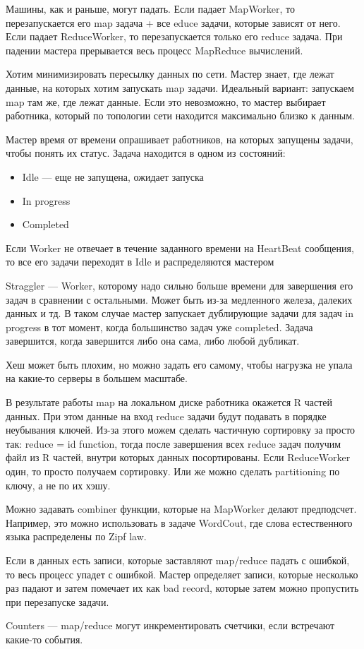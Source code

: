 \documentclass[12pt]{article}
\begin{document}
    \quad Машины, как и раньше, могут падать. Если падает MapWorker, то перезапускается его map задача + все educe задачи, которые зависят от него. Если падает ReduceWorker, то перезапускается только его reduce задача. При падении мастера прерывается весь процесс MapReduce вычислений.
    
    \quad Хотим минимизировать пересылку данных по сети. Мастер знает, где лежат данные, на которых хотим запускать map задачи. Идеальный вариант: запускаем map там же, где лежат данные. Если это невозможно, то мастер выбирает работника, который по топологии сети находится максимально близко к данным.
    
    \quad Мастер время от времени опрашивает работников, на которых запущены задачи, чтобы понять их статус. Задача находится в одном из состояний:
    \begin{itemize}
        \item Idle --- еще не запущена, ожидает запуска
        \item In progress
        \item Completed
    \end{itemize}
    Если Worker не отвечает в течение заданного времени на HeartBeat сообщения, то все его задачи переходят в Idle и распределяются мастером
    
    \quad Straggler --- Worker, которому надо сильно больше времени для завершения его задач в сравнении с остальными. Может быть из-за медленного железа, далеких данных и тд. В таком случае мастер запускает дублирующие задачи для задач in progress в тот момент, когда большинство задач уже completed. Задача завершится, когда завершится либо она сама, либо любой дубликат.
    
    \quad Хеш может быть плохим, но можно задать его самому, чтобы нагрузка не упала на какие-то серверы в большем масштабе.
    
    \quad В результате работы map на локальном диске работника окажется R частей данных. При этом данные на вход reduce задачи будут подавать в порядке неубывания ключей. Из-за этого можем сделать частичную сортировку за просто так: reduce = id function, тогда после завершения всех reduce задач получим файл из R частей, внутри которых данных посортированы. Если ReduceWorker один, то просто получаем сортировку. Или же можно сделать partitioning по ключу, а не по их хэшу.
    
    \quad Можно задавать combiner функции, которые на MapWorker делают предподсчет. Например, это можно использовать в задаче WordCout, где слова естественного языка распределены по Zipf law.
    
    \quad Если в данных есть записи, которые заставляют map/reduce падать с ошибкой, то весь процесс упадет с ошибкой. Мастер определяет записи, которые несколько раз падают и затем помечает их как bad record, которые затем можно пропустить при перезапуске задачи.
    
    \quad Counters --- map/reduce могут инкрементировать счетчики, если встречают какие-то события.
\end{document}
